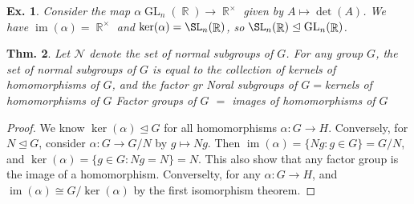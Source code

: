\documentclass[12pt, a4paper]{book}
\DeclareMathOperator{\R}{\mathbb{R}}
\DeclareMathOperator{\GL}{GL}
\DeclareMathOperator{\im}{im}
\newtheorem{theorem}{Thm.}[section]
\newtheorem{example}[theorem]{Ex.}
\theoremstyle{nonumberplain}
\newtheorem{proof}{Proof}
\begin{document}
\begin{example}
    Consider the map $\alpha\GL_n(\R)\to\R^\times$ given by $A\mapsto\det(A)$.
    We have $\im(\alpha)=\R^\times$ and $\ker(\alpha)=\SL_n(\R)$, so $\SL_n(\R)\trianglelefteq\GL_n(\R)$.
\end{example}
\begin{theorem}
    Let $\mathcal{N}$ denote the set of normal subgroups of $G$.
    For any group $G$, the set of normal subgroups of $G$ is equal to the collection of kernels of homomorphisms of $G$, and the factor gr
    Noral subgroups of $G=$kernels of homomorphisms of $G$
    Factor groups of $G$ $=$ images of homomorphisms of $G$
\end{theorem}
\begin{proof}
    We know $\ker(\alpha)\trianglelefteq G$ for all homomorphisms $\alpha:G\to H$.
    Conversely, for $N\trianglelefteq G$, consider $\alpha:G\to G/N$ by $g\mapsto Ng$.
    Then $\im(\alpha)=\{Ng:g\in G\}=G/N$, and $\ker(\alpha)=\{g\in G:Ng=N\}=N$.
    This also show that any factor group is the image of a homomorphism.
    Converselty, for any $\alpha:G\to H$, and $\im(\alpha)\cong G/\ker(\alpha)$ by the first isomorphism theorem.
\end{proof}
\end{document}
